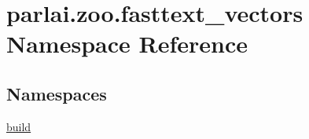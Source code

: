\hypertarget{namespaceparlai_1_1zoo_1_1fasttext__vectors}{}\section{parlai.\+zoo.\+fasttext\+\_\+vectors Namespace Reference}
\label{namespaceparlai_1_1zoo_1_1fasttext__vectors}
\subsection*{Namespaces}
\begin{DoxyCompactItemize}
\item 
 \hyperlink{namespaceparlai_1_1zoo_1_1fasttext__vectors_1_1build}{build}
\end{DoxyCompactItemize}

